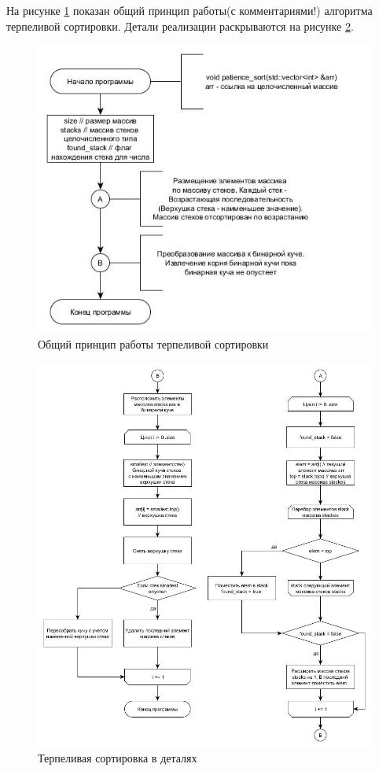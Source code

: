 \documentclass[a4paper, 14pt]{article}
\begin{document}
На рисунке \ref{ris:parti_1} показан общий принцип работы(с комментариями!) алгоритма терпеливой сортировки. Детали реализации раскрываются на рисунке \ref{ris:parti_2}.
\begin{figure}[h]
\centering
\center\includegraphics[scale=0.8]{parti_1.jpg}
\caption{Общий принцип работы терпеливой сортировки}
\label{ris:parti_1}
\end{figure}
\begin{figure}[h!]
\centering
\center\includegraphics[scale=0.5]{parti_2.jpg}
\caption{Терпеливая сортировка в деталях}
\label{ris:parti_2}
\end{figure}
	
\end{document}
